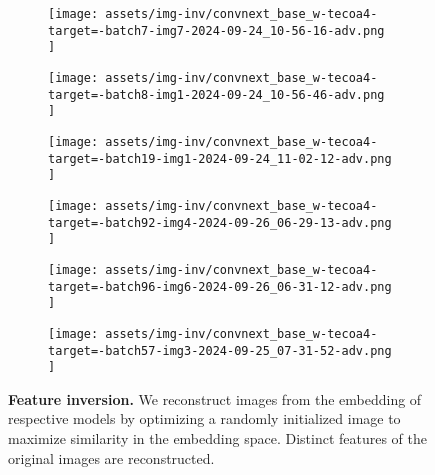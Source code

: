 \begin{figure*}[t]
    \vspace{1mm}
    \begin{minipage}[t]{.025\textwidth}
         \vspace{9mm}
    \end{minipage}%
    \begin{minipage}[t]{.98\textwidth}
        \vspace{0pt}
            \begin{subfigure}[t]{0.16\textwidth}
                    \texttt{[image:  assets/img-inv/convnext\_base\_w-tecoa4-target=-batch7-img7-2024-09-24\_10-56-16-adv.png ]}
            \end{subfigure}%
                \hspace{0.5mm}%
            \begin{subfigure}[t]{0.16\textwidth}
                    \texttt{[image:  assets/img-inv/convnext\_base\_w-tecoa4-target=-batch8-img1-2024-09-24\_10-56-46-adv.png ]}
            \end{subfigure}%
                \hspace{0.5mm}%
            \begin{subfigure}[t]{0.16\textwidth}
                    \texttt{[image:  assets/img-inv/convnext\_base\_w-tecoa4-target=-batch19-img1-2024-09-24\_11-02-12-adv.png ]}
            \end{subfigure}%
                \hspace{0.5mm}%
            \begin{subfigure}[t]{0.16\textwidth}
                    \texttt{[image:  assets/img-inv/convnext\_base\_w-tecoa4-target=-batch92-img4-2024-09-26\_06-29-13-adv.png ]}
            \end{subfigure}%
                \hspace{0.5mm}%
            \begin{subfigure}[t]{0.16\textwidth}
                    \texttt{[image:  assets/img-inv/convnext\_base\_w-tecoa4-target=-batch96-img6-2024-09-26\_06-31-12-adv.png ]}
            \end{subfigure}%
                \hspace{0.5mm}%
            \begin{subfigure}[t]{0.16\textwidth}
                    \texttt{[image:  assets/img-inv/convnext\_base\_w-tecoa4-target=-batch57-img3-2024-09-25\_07-31-52-adv.png ]}
            \end{subfigure}%
    \end{minipage}

    \vspace{1ex}
\caption{\textbf{Feature inversion.} We reconstruct images from the embedding of respective models by optimizing a randomly initialized image to maximize similarity in the embedding space. Distinct features of the original images are reconstructed.}
\label{fig:features-inv}
\end{figure*}